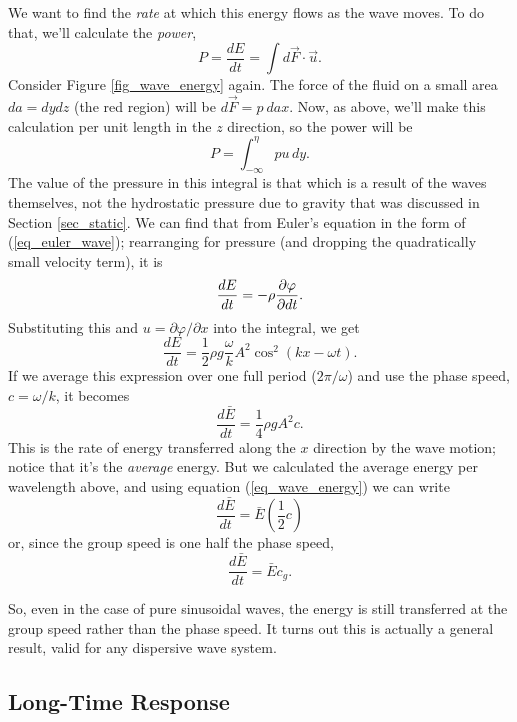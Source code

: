 We want to find the \emph{rate} at which this energy flows as the wave moves.  To do that, we'll calculate the \emph{power}, 
\[
P = \frac{dE}{dt} = \int d\vec{F} \cdot \vec{u}.
\]
Consider Figure \ref{fig_wave_energy} again.  The force of the fluid on a small area $da = dy dz$ (the red region) will be $d\vec{F} = p \ da \unit{x}$.  Now, as above, we'll make this calculation per unit length in the $z$ direction, so the power will be
\begin{equation}
P = \int_{-\infty}^\eta pu \, dy.
\end{equation}
The value of the pressure in this integral is that which is a result of the waves themselves, not the hydrostatic pressure due to gravity that was discussed in Section \ref{sec_static}.  We can find that from Euler's equation in the form of (\ref{eq_euler_wave}); rearranging for pressure (and dropping the quadratically small velocity term), it is
\begin{equation}
\frac{dE}{dt} = -\rho \frac{\partial {\varphi}}{\partial {dt}}.
\end{equation}
Substituting this and $u = \partial \varphi / \partial x$ into the integral, we get
\[
\frac{dE}{dt} = \frac{1}{2} \rho g \frac{\omega}{k} A^2 \cos^2(kx -\omega t).
\]
If we average this expression over one full period ($2\pi / \omega$) and use the phase speed, $c = \omega / k$, it becomes
\begin{equation}
\frac{d\bar{E}}{dt} = \frac{1}{4} \rho g A^2 c.
\end{equation}
This is the rate of energy transferred along the $x$ direction by the wave motion; notice that it's the \emph{average} energy.  But we calculated the average energy per wavelength above, and using equation (\ref{eq_wave_energy}) we can write
\[
\frac{d\bar{E}}{dt} = \bar{E} \left( \frac{1}{2} c \right)
\]
or, since the group speed is one half the phase speed,
\begin{equation}
\frac{d\bar{E}}{dt} = \bar{E} c_g.
\end{equation}

So, even in the case of pure sinusoidal waves, the energy is still transferred at the group speed rather than the phase speed.  It turns out this is actually a general result, valid for any dispersive  wave system.


\subsection{Long-Time Response}


